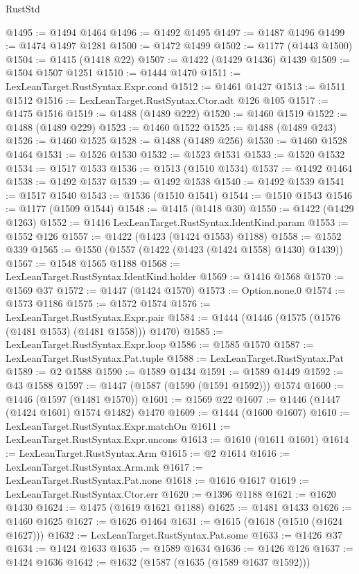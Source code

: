 \begin{lexlean}{RustStd}
\begin{coremodule}
@1495 := @1494 @1464
@1496 := @1492 @1495
@1497 := @1487 @1496
@1499 := @1474 @1497 @1281
@1500 := @1472 @1499
@1502 := @1177 (@1443 @1500)
@1504 := @1415 (@1418 @22)
@1507 := @1422 (@1429 @1436) @1439
@1509 := @1504 @1507 @1251
@1510 := @1444 @1470
@1511 := LexLeanTarget.RustSyntax.Expr.cond
@1512 := @1461 @1427
@1513 := @1511 @1512
@1516 := LexLeanTarget.RustSyntax.Ctor.adt @126 @105
@1517 := @1475 @1516
@1519 := @1488 (@1489 @222)
@1520 := @1460 @1519
@1522 := @1488 (@1489 @229)
@1523 := @1460 @1522
@1525 := @1488 (@1489 @243)
@1526 := @1460 @1525
@1528 := @1488 (@1489 @256)
@1530 := @1460 @1528 @1464
@1531 := @1526 @1530
@1532 := @1523 @1531
@1533 := @1520 @1532
@1534 := @1517 @1533
@1536 := @1513 (@1510 @1534)
@1537 := @1492 @1464
@1538 := @1492 @1537
@1539 := @1492 @1538
@1540 := @1492 @1539
@1541 := @1517 @1540
@1543 := @1536 (@1510 @1541)
@1544 := @1510 @1543
@1546 := @1177 (@1509 @1544)
@1548 := @1415 (@1418 @30)
@1550 := @1422 (@1429 @1263)
@1552 := @1416 LexLeanTarget.RustSyntax.IdentKind.param
@1553 := @1552 @126
@1557 := @1422 (@1423 (@1424 @1553) @1188)
@1558 := @1552 @339
@1565 := @1550 (@1557 (@1422 (@1423 (@1424 @1558) @1430) @1439))
@1567 := @1548 @1565 @1188
@1568 := LexLeanTarget.RustSyntax.IdentKind.holder
@1569 := @1416 @1568
@1570 := @1569 @37
@1572 := @1447 (@1424 @1570)
@1573 := Option.none.{0}
@1574 := @1573 @1186
@1575 := @1572 @1574
@1576 := LexLeanTarget.RustSyntax.Expr.pair
@1584 := @1444 (@1446 (@1575 (@1576 (@1481 @1553) (@1481 @1558))) @1470)
@1585 := LexLeanTarget.RustSyntax.Expr.loop
@1586 := @1585 @1570
@1587 := LexLeanTarget.RustSyntax.Pat.tuple
@1588 := LexLeanTarget.RustSyntax.Pat
@1589 := @2 @1588
@1590 := @1589 @1434
@1591 := @1589 @1449
@1592 := @43 @1588
@1597 := @1447 (@1587 (@1590 (@1591 @1592))) @1574
@1600 := @1446 (@1597 (@1481 @1570))
@1601 := @1569 @22
@1607 := @1446 (@1447 (@1424 @1601) @1574 @1482) @1470
@1609 := @1444 (@1600 @1607)
@1610 := LexLeanTarget.RustSyntax.Expr.matchOn
@1611 := LexLeanTarget.RustSyntax.Expr.uncons
@1613 := @1610 (@1611 @1601)
@1614 := LexLeanTarget.RustSyntax.Arm
@1615 := @2 @1614
@1616 := LexLeanTarget.RustSyntax.Arm.mk
@1617 := LexLeanTarget.RustSyntax.Pat.none
@1618 := @1616 @1617
@1619 := LexLeanTarget.RustSyntax.Ctor.err
@1620 := @1396 @1188
@1621 := @1620 @1430
@1624 := @1475 (@1619 @1621 @1188)
@1625 := @1481 @1433
@1626 := @1460 @1625
@1627 := @1626 @1464
@1631 := @1615 (@1618 (@1510 (@1624 @1627)))
@1632 := LexLeanTarget.RustSyntax.Pat.some
@1633 := @1426 @37
@1634 := @1424 @1633
@1635 := @1589 @1634
@1636 := @1426 @126
@1637 := @1424 @1636
@1642 := @1632 (@1587 (@1635 (@1589 @1637 @1592)))

\end{coremodule}
\end{lexlean}
